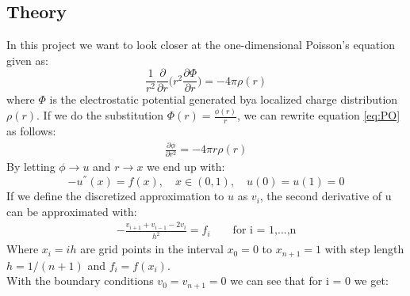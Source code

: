 \documentclass[12pt,a4paper]{article}
\newcommand{\Tom}[1]{\Big( #1 \Big)}
\begin{document}
\subsection*{Theory}
In this project we want to look closer at the one-dimensional Poisson's equation given as:
\begin{equation}
\frac{1}{r^2} \frac{\partial}{\partial r} \Tom{r^2 \frac{\partial \Phi}{\partial r}} = - 4 \pi \rho(r)
\label{eq:PO}
\end{equation}
where $\Phi$ is the electrostatic potential generated bya localized charge distribution $\rho(r)$. If we do the substitution $\Phi(r) = \frac{\phi(r)}{r}$, we can rewrite equation \eqref{eq:PO} as follows:
\begin{align*}
\frac{\partial \phi}{\partial r^2} = - 4 \pi r \rho(r)
\end{align*}
By letting $\phi \rightarrow u$ and $r \rightarrow x$ we end up with:
\begin{equation}
-u^{''}(x) = f(x), \quad x \in (0,1), \quad u(0) = u(1) = 0
\label{eq:po}
\end{equation}
If we define the discretized approximation to $u$ as $v_i$, the second derivative of u can be approximated with:
\begin{align*}
- \frac{v_{i + 1} + v_{i-1} - 2v_i}{h^2} = f_i \qquad \text{for i = 1,...,n}
\end{align*}
Where $x_i = ih$ are grid points in the interval $x_0 = 0$ to $x_{n+1} = 1$ with step length $h = 1/(n+1)$ and $f_i = f(x_i)$. \\ 
With the boundary conditions $v_0 = v_{n + 1} = 0$ we can see that for i = 0 we get:
\end{document}
